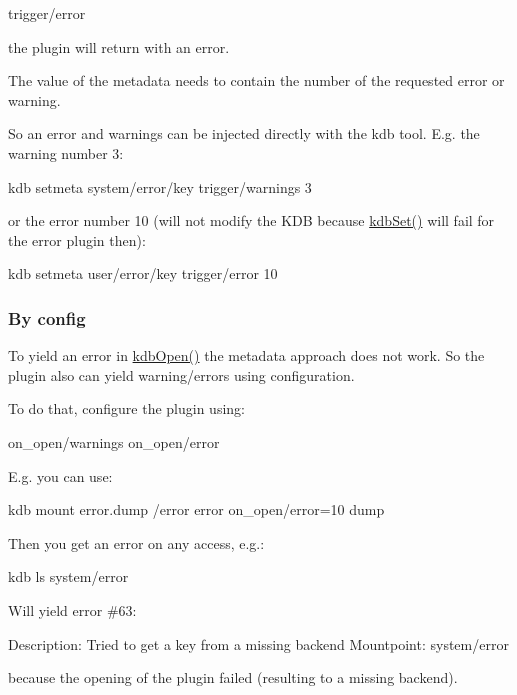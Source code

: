 \begin{DoxyCode}
trigger/error
\end{DoxyCode}


the plugin will return with an error.

The value of the metadata needs to contain the number of the requested error or warning.

So an error and warnings can be injected directly with the kdb tool. E.\+g. the warning number 3\+:


\begin{DoxyCode}
kdb setmeta system/error/key trigger/warnings 3
\end{DoxyCode}


or the error number 10 (will not modify the K\+DB because {\ttfamily \hyperlink{group__kdb_ga11436b058408f83d303ca5e996832bcf}{kdb\+Set()}} will fail for the error plugin then)\+:


\begin{DoxyCode}
kdb setmeta user/error/key trigger/error 10
\end{DoxyCode}


\subsubsection*{By config}

To yield an error in \hyperlink{group__kdb_ga6808defe5870f328dd17910aacbdc6ca}{kdb\+Open()} the metadata approach does not work. So the plugin also can yield warning/errors using configuration.

To do that, configure the plugin using\+:


\begin{DoxyCode}
on\_open/warnings
on\_open/error
\end{DoxyCode}


E.\+g. you can use\+:


\begin{DoxyCode}
kdb mount error.dump /error error on\_open/error=10 dump
\end{DoxyCode}


Then you get an error on any access, e.\+g.\+:


\begin{DoxyCode}
kdb ls system/error
\end{DoxyCode}


Will yield error \#63\+:


\begin{DoxyCode}
Description: Tried to get a key from a missing backend
Mountpoint: system/error
\end{DoxyCode}


because the opening of the plugin failed (resulting to a missing backend). 